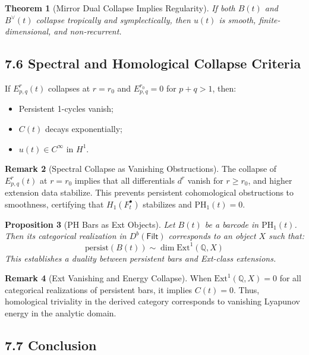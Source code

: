 \documentclass[11pt]{article}
\newtheorem{theorem}{Theorem}[section]
\newtheorem{proposition}[theorem]{Proposition}
\theoremstyle{definition}
\newtheorem{remark}[theorem]{Remark}
\begin{document}
\begin{theorem}[Mirror Dual Collapse Implies Regularity]
If both $B(t)$ and $B^\vee(t)$ collapse tropically and symplectically, then $u(t)$ is smooth, finite-dimensional, and non-recurrent.
\end{theorem}

\subsection*{7.6 Spectral and Homological Collapse Criteria}

If $E^r_{p,q}(t)$ collapses at $r = r_0$ and $E^{r_0}_{p,q}=0$ for $p+q>1$, then:
\begin{itemize}
  \item Persistent 1-cycles vanish;
  \item $C(t)$ decays exponentially;
  \item $u(t) \in C^\infty$ in $H^1$.
\end{itemize}

\begin{remark}[Spectral Collapse as Vanishing Obstructions]
The collapse of $E^r_{p,q}(t)$ at $r = r_0$ implies that all differentials $d^r$ vanish for $r \ge r_0$, and higher extension data stabilize. This prevents persistent cohomological obstructions to smoothness, certifying that $H_1(F^\bullet_t)$ stabilizes and $\mathrm{PH}_1(t) = 0$.
\end{remark}

\begin{proposition}[PH Bars as Ext Objects]
Let $B(t)$ be a barcode in $\mathrm{PH}_1(t)$. Then its categorical realization in $D^b(\mathsf{Filt})$ corresponds to an object $X$ such that:
\[
\text{persist}(B(t)) \sim \dim \mathrm{Ext}^1(\mathbb{Q}, X)
\]
This establishes a duality between persistent bars and Ext-class extensions.
\end{proposition}

\begin{remark}[Ext Vanishing and Energy Collapse]
When $\mathrm{Ext}^1(\mathbb{Q}, X) = 0$ for all categorical realizations of persistent bars, it implies $C(t) = 0$. Thus, homological triviality in the derived category corresponds to vanishing Lyapunov energy in the analytic domain.
\end{remark}

\subsection*{7.7 Conclusion}
\end{document}
